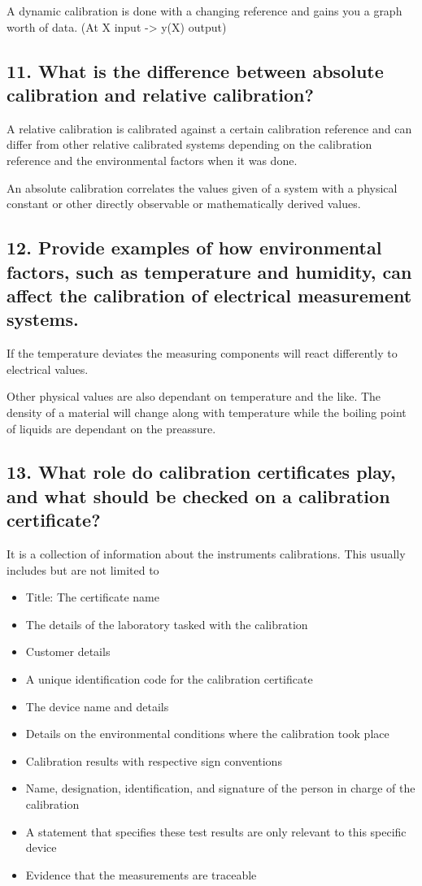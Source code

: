 A dynamic calibration is done with a changing reference and gains you a graph worth of data. (At X input -> y(X) output)

\subsection{\textbf{11. What is the difference between absolute calibration and relative calibration?}}
A relative calibration is calibrated against a certain calibration reference and can differ from other relative calibrated systems depending on the calibration reference and the environmental factors when it was done.

An absolute calibration correlates the values given of a system with a physical constant or other directly observable or mathematically derived values.


\subsection{\textbf{12. Provide examples of how environmental factors, such as temperature and humidity, can affect the calibration of electrical measurement systems.}}

If the temperature deviates the measuring components will react differently to electrical values. 

Other physical values are also dependant on temperature and the like. The density of a material will change along with temperature while the boiling point of liquids are dependant on the preassure.


\subsection{\textbf{13. What role do calibration certificates play, and what should be checked on a calibration certificate?}}
It is a collection of information about the instruments calibrations. This usually includes but are not limited to 
\begin{itemize}
    \item Title: The certificate name
    \item The details of the laboratory tasked with the calibration
    \item Customer details
    \item A unique identification code for the calibration certificate
    \item The device name and details
    \item Details on the environmental conditions where the calibration took place
    \item Calibration results with respective sign conventions
    \item Name, designation, identification, and signature of the person in charge of the calibration
    \item A statement that specifies these test results are only relevant to this specific device
    \item Evidence that the measurements are traceable
\end{itemize}

